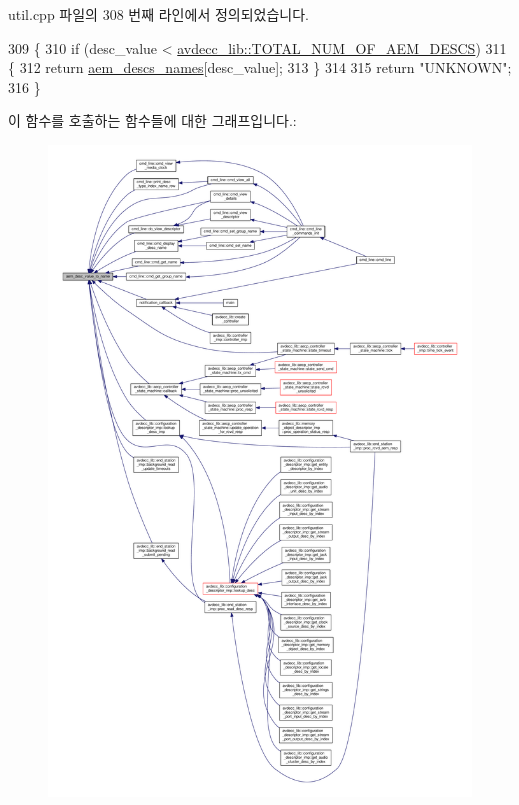 util.\+cpp 파일의 308 번째 라인에서 정의되었습니다.


\begin{DoxyCode}
309     \{
310         \textcolor{keywordflow}{if} (desc\_value < \hyperlink{namespaceavdecc__lib_ac7b7d227e46bc72b63ee9e9aae15902fa1e5a2c47a663ddd337dec63b09b44823}{avdecc\_lib::TOTAL\_NUM\_OF\_AEM\_DESCS})
311         \{
312             \textcolor{keywordflow}{return} \hyperlink{namespaceavdecc__lib_1_1utility_a955f5e9abfcb9e061107640d8afbed23}{aem\_descs\_names}[desc\_value];
313         \}
314 
315         \textcolor{keywordflow}{return} \textcolor{stringliteral}{"UNKNOWN"};
316     \}
\end{DoxyCode}


이 함수를 호출하는 함수들에 대한 그래프입니다.\+:
\nopagebreak
\begin{figure}[H]
\begin{center}
\leavevmode
\includegraphics[width=350pt]{namespaceavdecc__lib_1_1utility_a6bdd02679e5a911a071d4aa03be341f0_icgraph}
\end{center}
\end{figure}


